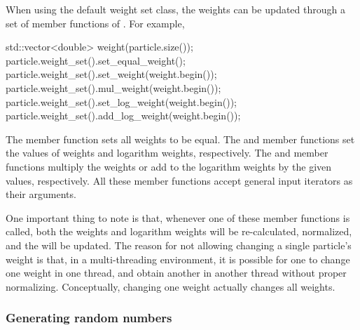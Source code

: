 When using the default weight set class, the weights can be updated through a
set of member functions of . For example,
\begin{cppcode}
std::vector<double> weight(particle.size());
particle.weight_set().set_equal_weight();
particle.weight_set().set_weight(weight.begin());
particle.weight_set().mul_weight(weight.begin());
particle.weight_set().set_log_weight(weight.begin());
particle.weight_set().add_log_weight(weight.begin());
\end{cppcode}
The  member function sets all weights to be equal. The
 and  member functions set the values of
weights and logarithm weights, respectively. The  and
 member functions multiply the weights or add to the
logarithm weights by the given values, respectively. All these member functions
accept general input iterators as their arguments.

One important thing to note is that, whenever one of these member functions is
called, both the weights and logarithm weights will be re-calculated,
normalized, and the \ess will be updated. The reason for not allowing changing
a single particle's weight is that, in a multi-threading environment, it is
possible for one to change one weight in one thread, and obtain another in
another thread without proper normalizing. Conceptually, changing one weight
actually changes all weights.

\subsubsection{Generating random numbers}

